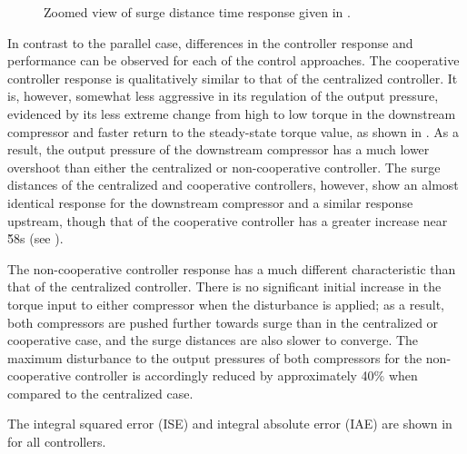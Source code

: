 \begin{figure}
  \resizebox{\linewidth}{!}{%
    
  }
  \caption[Zoomed view of surge distance time response of serial system.]{Zoomed view of surge distance time response given in .}
  \label{fig:res:serial-sd-zoom}
\end{figure}

In contrast to the parallel case, differences in the controller response and performance can be observed for each of the control approaches.
The cooperative controller response is qualitatively similar to that of the centralized controller.
It is, however, somewhat less aggressive in its regulation of the output pressure, evidenced by its less extreme change from high to low torque in the downstream compressor and faster return to the steady-state torque value, as shown in .
As a result, the output pressure of the downstream compressor has a much lower overshoot than either the centralized or non-cooperative controller.
%
The surge distances of the centralized and cooperative controllers, however, show an almost identical response for the downstream compressor and a similar response upstream, though that of the cooperative controller has a greater increase near \u{58}{s} (see ).

The non-cooperative controller response has a much different characteristic than that of the centralized controller.
There is no significant initial increase in the torque input to either compressor when the disturbance is applied; as a result, both compressors are pushed further towards surge than in the centralized or cooperative case, and the surge distances are also slower to converge.
The maximum disturbance to the output pressures of both compressors for the non-cooperative controller is accordingly reduced by approximately 40\% when compared to the centralized case.

The integral squared error (ISE) and integral absolute error (IAE) are shown in  for all controllers.

